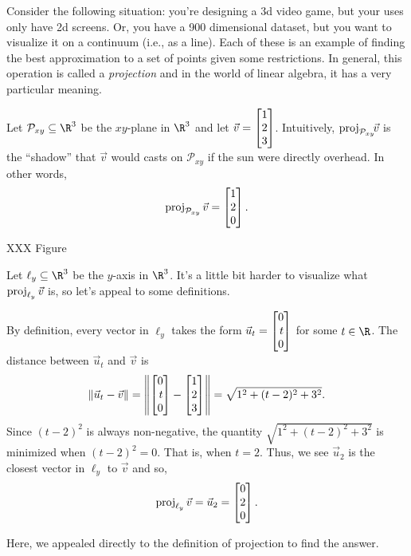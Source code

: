 Consider the following situation: you're designing a 3d video game, but your uses only have 2d screens.
Or, you have a 900 dimensional dataset, but you want to visualize it on a continuum (i.e., as a line). 
Each of these is an example
of finding the best approximation to a set of points given some restrictions. In general, this operation
is called a \emph{projection} and in the world of linear algebra, it has a very particular meaning.


Let $\mathcal P_{xy}\subseteq\R^3$ be the $xy$-plane in $\R^3$ and let $\vec v=\mat{1\\2\\3}$. Intuitively, 
$\operatorname{proj}_{\mathcal P_{xy}}\!\!\vec v$ is the ``shadow'' that  $\vec v$ would casts on ${\mathcal P_{xy}}$ if 
the sun were directly overhead.
In other words,
\[
	\Proj_{\mathcal P_{xy}}\vec v=\mat{1\\2\\0}.
\]

XXX Figure

Let $\ell_y\subseteq \R^3$ be the $y$-axis in $\R^3$. It's a little bit harder to visualize what $\operatorname{proj}_{\ell_y}\vec v$
is, so let's appeal to some definitions.

By definition, every vector in $\ell_y$ takes the form $\vec u_t=\mat{0\\t\\0}$ for some $t\in \R$. The distance
between $\vec u_t$ and $\vec v$ is
\[
	\Norm{\vec u_t-\vec v}=\norm*{\mat{0\\t\\0}-\mat{1\\2\\3}} = \sqrt{1^2+(t-2)^2+3^2}.
\]
Since $(t-2)^2$ is always non-negative, the quantity $\sqrt{1^2+(t-2)^2+3^2}$ is minimized when $(t-2)^2=0$. That is,
when $t=2$. Thus, we see $\vec u_2$ is the closest vector in $\ell_y$ to $\vec v$ and so,
\[
	\Proj_{\ell_y}\vec v=\vec u_2=\mat{0\\2\\0}.
\]

Here, we appealed directly to the definition of projection to find the answer.

